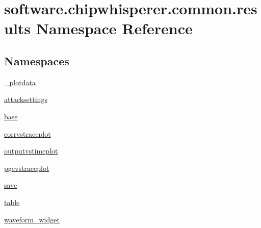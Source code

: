 \hypertarget{namespacesoftware_1_1chipwhisperer_1_1common_1_1results}{}\section{software.\+chipwhisperer.\+common.\+results Namespace Reference}
\label{namespacesoftware_1_1chipwhisperer_1_1common_1_1results}
\subsection*{Namespaces}
\begin{DoxyCompactItemize}
\item 
 \hyperlink{namespacesoftware_1_1chipwhisperer_1_1common_1_1results_1_1__plotdata}{\+\_\+plotdata}
\item 
 \hyperlink{namespacesoftware_1_1chipwhisperer_1_1common_1_1results_1_1attacksettings}{attacksettings}
\item 
 \hyperlink{namespacesoftware_1_1chipwhisperer_1_1common_1_1results_1_1base}{base}
\item 
 \hyperlink{namespacesoftware_1_1chipwhisperer_1_1common_1_1results_1_1corrvstraceplot}{corrvstraceplot}
\item 
 \hyperlink{namespacesoftware_1_1chipwhisperer_1_1common_1_1results_1_1outputvstimeplot}{outputvstimeplot}
\item 
 \hyperlink{namespacesoftware_1_1chipwhisperer_1_1common_1_1results_1_1pgevstraceplot}{pgevstraceplot}
\item 
 \hyperlink{namespacesoftware_1_1chipwhisperer_1_1common_1_1results_1_1save}{save}
\item 
 \hyperlink{namespacesoftware_1_1chipwhisperer_1_1common_1_1results_1_1table}{table}
\item 
 \hyperlink{namespacesoftware_1_1chipwhisperer_1_1common_1_1results_1_1waveform__widget}{waveform\+\_\+widget}
\end{DoxyCompactItemize}
